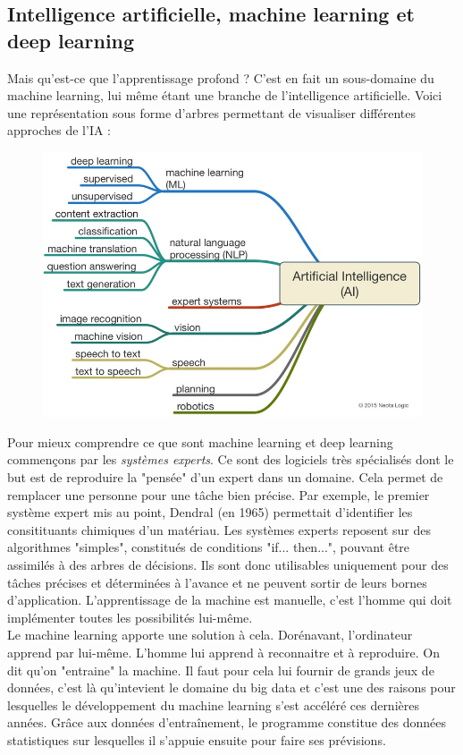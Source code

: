 \subsection{Intelligence artificielle, machine learning et deep learning}
	Mais qu'est-ce que l'apprentissage profond ? C'est en fait un sous-domaine du machine learning, lui même étant une branche de l'intelligence artificielle. Voici une représentation sous forme d'arbres permettant de visualiser différentes approches de l'IA : 
	\begin{figure}[H]
		\centering\includegraphics[width=0.7\linewidth]{images/branches}
	\end{figure}
	Pour mieux comprendre ce que sont machine learning et deep learning commençons par les \textit{systèmes experts}. Ce sont des logiciels très spécialisés dont le but est de reproduire la "pensée" d'un expert dans un domaine. Cela permet de remplacer une personne pour une tâche bien précise. Par exemple, le premier système expert mis au point, Dendral (en 1965) permettait d'identifier les consitituants chimiques d'un matériau. Les systèmes experts reposent sur des algorithmes "simples", constitués de conditions "if... then...", pouvant être assimilés à des arbres de décisions. Ils sont donc utilisables uniquement pour des tâches précises et déterminées à l'avance et ne peuvent sortir de leurs bornes d'application. L'apprentissage de la machine est manuelle, c'est l'homme qui doit implémenter toutes les possibilités lui-même.\\
	
	Le machine learning apporte une solution à cela. Dorénavant, l'ordinateur apprend par lui-même. L'homme lui apprend à reconnaitre et à reproduire. On dit qu'on "entraine" la machine. Il faut pour cela lui fournir de grands jeux de données, c'est là qu'intevient le domaine du big data et c'est une des raisons pour lesquelles le développement du machine learning s'est accéléré ces dernières années. Grâce aux données d'entraînement, le programme constitue des données statistiques sur lesquelles il s'appuie ensuite pour faire ses prévisions. \\
	
